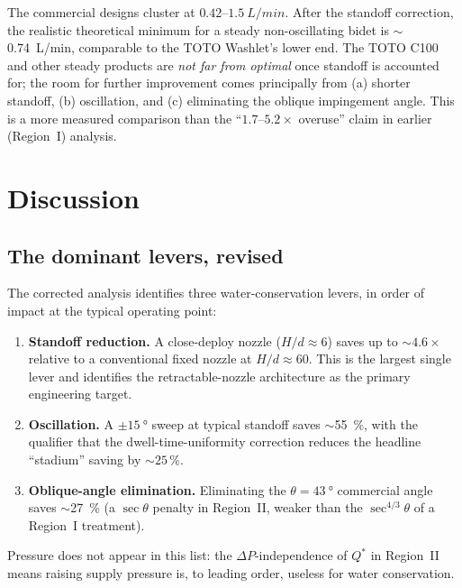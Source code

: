 \documentclass[aps,prfluids,reprint,amsmath,amssymb,floatfix]{revtex4-2}
\begin{document}
The commercial designs cluster at $0.42$--$\SI{1.5}{L/min}$. After the
standoff correction, the realistic theoretical minimum for a steady
non-oscillating bidet is $\sim$\SI{0.74}{L/min}, comparable to the
TOTO Washlet's lower end. The TOTO C100 and other steady products are
\emph{not far from optimal} once standoff is accounted for; the room
for further improvement comes principally from (a) shorter standoff,
(b) oscillation, and (c) eliminating the oblique impingement angle.
This is a more measured comparison than the ``$1.7$--$5.2\times$
overuse'' claim in earlier (Region~I) analysis.

\section{Discussion}
\label{sec:discussion}

\subsection{The dominant levers, revised}

The corrected analysis identifies three water-conservation levers, in
order of impact at the typical operating point:
\begin{enumerate}[leftmargin=*]
  \item \textbf{Standoff reduction.} A close-deploy nozzle ($H/d \approx 6$)
  saves up to $\sim 4.6\times$ relative to a conventional fixed nozzle at
  $H/d \approx 60$. This is the largest single lever and identifies the
  retractable-nozzle architecture as the primary engineering target.
  \item \textbf{Oscillation.} A $\pm\SI{15}{\degree}$ sweep at typical
  standoff saves $\sim$\SI{55}{\percent}, with the qualifier that the
  dwell-time-uniformity correction reduces the headline ``stadium''
  saving by $\sim 25$\,\%.
  \item \textbf{Oblique-angle elimination.} Eliminating the
  $\theta = \SI{43}{\degree}$ commercial angle saves
  $\sim$\SI{27}{\percent} (a $\sec\theta$ penalty in Region~II, weaker
  than the $\sec^{4/3}\theta$ of a Region~I treatment).
\end{enumerate}
Pressure does not appear in this list: the $\Delta P$-independence of
$Q^*$ in Region~II means raising supply pressure is, to leading order,
useless for water conservation.
\end{document}
